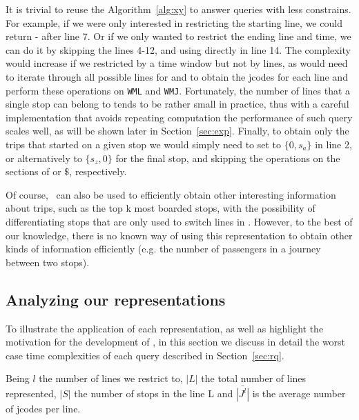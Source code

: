     It is trivial to reuse the Algorithm~\ref{alg:xy} to answer queries with less constrains. For example, if we were only interested in restricting the starting line, we could return - after line 7. Or if we only wanted to restrict the ending line and time, we can do it by skipping the lines 4-12, and using directly  in line 14. The complexity would increase if we restricted by a time window but not by lines, as would need to iterate through all possible lines for  and  to obtain the jcodes for each line and perform these operations on \texttt{WML} and \texttt{WMJ}. Fortunately, the number of lines that a single stop can belong to tends to be rather small in practice, thus with a careful implementation that avoids repeating computation the performance of such query scales well, as will be shown later in Section~\ref{sec:exp}. Finally, to obtain only the trips that started on a given stop we would simply need to set  to $\{0,s_a\}$ in line 2, or alternatively to $\{s_z,0\}$ for the final stop, and skipping the operations on the sections of  or $\$$, respectively.
    
    Of course, \ctr~can also be used to efficiently obtain other interesting information about trips, such as the top k most boarded stops, 
    with the possibility of differentiating stops that are only used to switch lines in \ctr. However, to the best of our knowledge, there is no known way of using this representation to obtain other kinds of information efficiently (e.g. the number of passengers in a journey between two stops).
	
	\subsection{Analyzing our representations}
	To illustrate the application of each representation, as well as highlight the motivation for the development of \ctr, in this section we discuss in detail the worst case time complexities of each query described in Section~\ref{sec:rq}. 

    Being $l$ the number of lines we restrict to, $|L|$ the total number of lines represented, $|S|$ the number of stops in the line L and $\bar{|J^l|}$ is the average number of jcodes per line.
    
